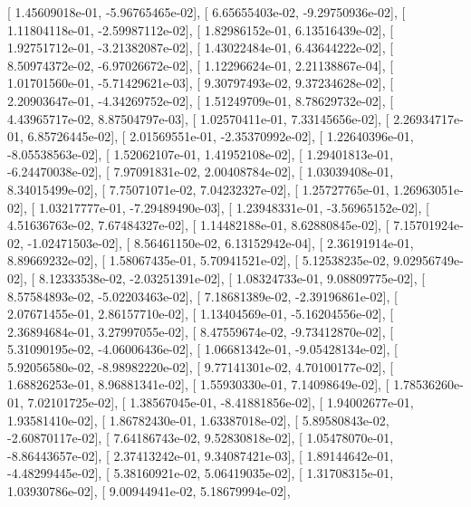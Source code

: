 \documentclass{article}
\begin{document}
       [  1.45609018e-01,  -5.96765465e-02],
       [  6.65655403e-02,  -9.29750936e-02],
       [  1.11804118e-01,  -2.59987112e-02],
       [  1.82986152e-01,   6.13516439e-02],
       [  1.92751712e-01,  -3.21382087e-02],
       [  1.43022484e-01,   6.43644222e-02],
       [  8.50974372e-02,  -6.97026672e-02],
       [  1.12296624e-01,   2.21138867e-04],
       [  1.01701560e-01,  -5.71429621e-03],
       [  9.30797493e-02,   9.37234628e-02],
       [  2.20903647e-01,  -4.34269752e-02],
       [  1.51249709e-01,   8.78629732e-02],
       [  4.43965717e-02,   8.87504797e-03],
       [  1.02570411e-01,   7.33145656e-02],
       [  2.26934717e-01,   6.85726445e-02],
       [  2.01569551e-01,  -2.35370992e-02],
       [  1.22640396e-01,  -8.05538563e-02],
       [  1.52062107e-01,   1.41952108e-02],
       [  1.29401813e-01,  -6.24470038e-02],
       [  7.97091831e-02,   2.00408784e-02],
       [  1.03039408e-01,   8.34015499e-02],
       [  7.75071071e-02,   7.04232327e-02],
       [  1.25727765e-01,   1.26963051e-02],
       [  1.03217777e-01,  -7.29489490e-03],
       [  1.23948331e-01,  -3.56965152e-02],
       [  4.51636763e-02,   7.67484327e-02],
       [  1.14482188e-01,   8.62880845e-02],
       [  7.15701924e-02,  -1.02471503e-02],
       [  8.56461150e-02,   6.13152942e-04],
       [  2.36191914e-01,   8.89669232e-02],
       [  1.58067435e-01,   5.70941521e-02],
       [  5.12538235e-02,   9.02956749e-02],
       [  8.12333538e-02,  -2.03251391e-02],
       [  1.08324733e-01,   9.08809775e-02],
       [  8.57584893e-02,  -5.02203463e-02],
       [  7.18681389e-02,  -2.39196861e-02],
       [  2.07671455e-01,   2.86157710e-02],
       [  1.13404569e-01,  -5.16204556e-02],
       [  2.36894684e-01,   3.27997055e-02],
       [  8.47559674e-02,  -9.73412870e-02],
       [  5.31090195e-02,  -4.06006436e-02],
       [  1.06681342e-01,  -9.05428134e-02],
       [  5.92056580e-02,  -8.98982220e-02],
       [  9.77141301e-02,   4.70100177e-02],
       [  1.68826253e-01,   8.96881341e-02],
       [  1.55930330e-01,   7.14098649e-02],
       [  1.78536260e-01,   7.02101725e-02],
       [  1.38567045e-01,  -8.41881856e-02],
       [  1.94002677e-01,   1.93581410e-02],
       [  1.86782430e-01,   1.63387018e-02],
       [  5.89580843e-02,  -2.60870117e-02],
       [  7.64186743e-02,   9.52830818e-02],
       [  1.05478070e-01,  -8.86443657e-02],
       [  2.37413242e-01,   9.34087421e-03],
       [  1.89144642e-01,  -4.48299445e-02],
       [  5.38160921e-02,   5.06419035e-02],
       [  1.31708315e-01,   1.03930786e-02],
       [  9.00944941e-02,   5.18679994e-02],
\end{document}
